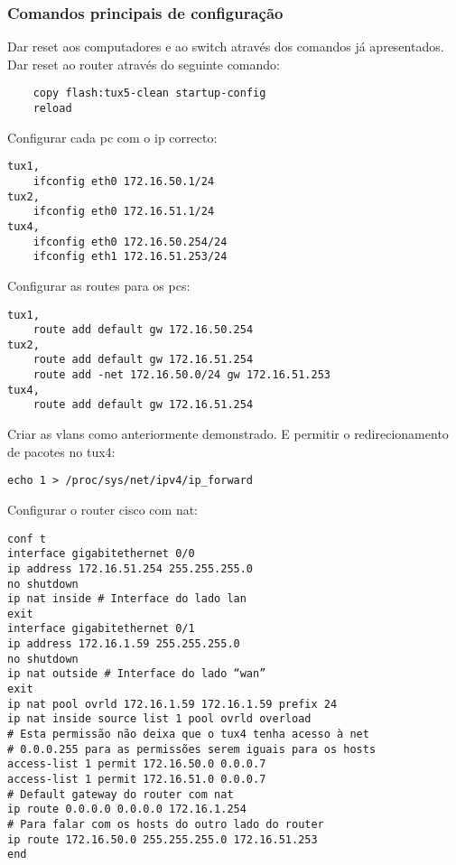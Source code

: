 \documentclass[a4paper]{article}
\begin{document}
\subsubsection{Comandos principais de configuração}

Dar reset aos computadores e ao switch através dos comandos já apresentados.\\

Dar reset ao router através do seguinte comando:
\begin{verbatim}
    copy flash:tux5-clean startup-config
    reload
\end{verbatim}

Configurar cada pc com o ip correcto:
\begin{verbatim}
tux1,
    ifconfig eth0 172.16.50.1/24
tux2,
    ifconfig eth0 172.16.51.1/24
tux4,
    ifconfig eth0 172.16.50.254/24
    ifconfig eth1 172.16.51.253/24
\end{verbatim}

Configurar as routes para os pcs:
\begin{verbatim}
tux1,
    route add default gw 172.16.50.254
tux2,
    route add default gw 172.16.51.254
    route add -net 172.16.50.0/24 gw 172.16.51.253
tux4,
    route add default gw 172.16.51.254
\end{verbatim}

Criar as vlans como anteriormente demonstrado. E permitir o redirecionamento de pacotes no tux4:
\begin{verbatim}
echo 1 > /proc/sys/net/ipv4/ip_forward
\end{verbatim}

Configurar o router cisco com nat:
\begin{verbatim}
conf t
interface gigabitethernet 0/0
ip address 172.16.51.254 255.255.255.0
no shutdown
ip nat inside # Interface do lado lan
exit
interface gigabitethernet 0/1
ip address 172.16.1.59 255.255.255.0
no shutdown
ip nat outside # Interface do lado “wan”
exit
ip nat pool ovrld 172.16.1.59 172.16.1.59 prefix 24
ip nat inside source list 1 pool ovrld overload
# Esta permissão não deixa que o tux4 tenha acesso à net
# 0.0.0.255 para as permissões serem iguais para os hosts
access-list 1 permit 172.16.50.0 0.0.0.7
access-list 1 permit 172.16.51.0 0.0.0.7
# Default gateway do router com nat
ip route 0.0.0.0 0.0.0.0 172.16.1.254
# Para falar com os hosts do outro lado do router
ip route 172.16.50.0 255.255.255.0 172.16.51.253
end
\end{verbatim}
\end{document}
